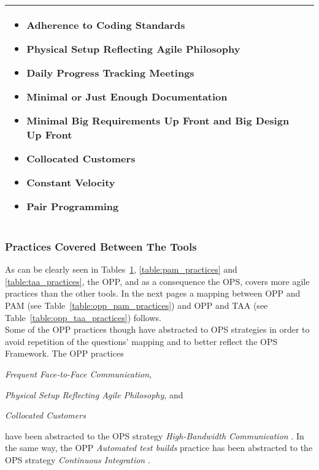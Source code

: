 \begin{table}
\begin{tabular}{| p{7.5cm}  p{7.5cm} |}
\begin{itemize}
     		\item Adherence to Coding Standards 
     		\item Physical Setup Reflecting Agile Philosophy
     		\item Daily Progress Tracking Meetings 
     		\item Minimal or Just Enough Documentation 
     		\item Minimal Big Requirements Up Front and Big Design Up Front 
     		\item Collocated Customers
     		\item Constant Velocity 
     		\item Pair Programming  
 		\end{itemize} 
     \\ \hline
\end{tabular}
\label{table:opp_practices}
\end{table}

\subsubsection[Tool Practices]{Practices Covered Between The Tools}

As can be clearly seen in Tables~\ref{table:opp_practices}, \ref{table:pam_practices} and \ref{table:taa_practices}, the \ac{OPP}, and as a consequence the \ac{OPS}, covers more agile practices than the other tools. In the next pages a mapping between \ac{OPP} and \ac{PAM} (see Table~\ref{table:opp_pam_practices}) and \ac{OPP} and \ac{TAA} (see Table~\ref{table:opp_taa_practices}) follows. \\

Some of the \ac{OPP} practices though have abstracted to \ac{OPS} strategies in order to avoid repetition of the questions' mapping and to better reflect the \ac{OPS} Framework. The \ac{OPP} practices 
\begin{inparaenum} [a\upshape)]
	\item \textit{Frequent Face-to-Face Communication},
	\item \textit{Physical Setup Reflecting Agile Philosophy}, and
	\item \textit{Collocated Customers}
\end{inparaenum} have been abstracted to the \ac{OPS} strategy \textit{High-Bandwidth Communication}  \cite[p. 57]{sventha_dissertation}. In the same way, the \ac{OPP} \textit{Automated test builds} practice has been abstracted to the \ac{OPS} strategy \textit{Continuous Integration} \cite[p. 57]{sventha_dissertation}. \\

